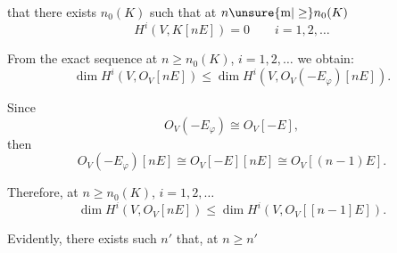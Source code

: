 
that there exists $n_0(K)$ such that at $n\unsure{\mathrm m|\geq}n_0(K)$
\[
H^i(V,K[nE])=0\qquad i=1,2,\ldots
\]

From the exact sequence
at $n\geq n_0(K)$, $i=1,2,\ldots$ we obtain:
\[
\dim H^i(V,O_V[nE])\leq\dim H^i(V,O_V(-E_{\varphi})[nE]).
\]

Since
\[
O_V(-E_{\varphi})\cong O_V[-E],
\]
then
\[
O_V(-E_{\varphi})[nE]\cong O_V[-E][nE]\cong O_V[(n-1)E].
\]

Therefore, at $n\geq n_0(K)$, $i=1,2,\ldots$
\[
\dim H^i(V,O_V[nE])\leq\dim H^i(V,O_V[[n-1]E]).
\]

Evidently, there exists such $n'$ that, at $n\geq n'$

